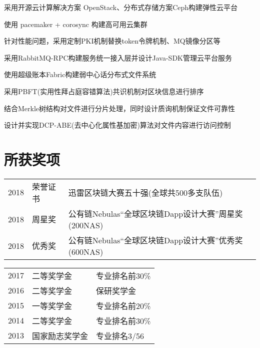 \documentclass[]{deedy-resume-openfont}
\begin{document}
\begin{minipage}[t]{0.68\textwidth}
\begin{tightemize}
    \item 采用开源云计算解决方案 OpenStack、分布式存储方案Ceph构建弹性云平台
    \item 使用 pacemaker + corosync 构建高可用云集群
    \item 针对性能问题，采用定制PKI机制替换token令牌机制、MQ镜像分区等
    \item 采用RabbitMQ-RPC构建服务统一接入层并设计Java-SDK管理云平台服务
    \end{tightemize}
\sectionsep

\begin{tightemize}
    \item 使用超级账本Fabric构建弱中心话分布式文件系统
    \item 采用PBFT(实用性拜占庭容错算法)共识机制对区块信息进行排序
    \item 结合Merkle树结构对文件进行分片处理，同时设计质询机制保证文件可靠性
    \item 设计并实现DCP-ABE(去中心化属性基加密)算法对文件内容进行访问控制
    \end{tightemize}
\sectionsep

\section{所获奖项}
\begin{tabular}{rll}
2018         & 荣誉证书  & 迅雷区块链大赛五十强(全球共500多支队伍) \\
2018         & 周星奖 & 公有链Nebulas“全球区块链Dapp设计大赛”周星奖(200NAS) \\
2018         & 优秀奖 & 公有链Nebulas“全球区块链Dapp设计大赛”优秀奖(600NAS) \\
\end{tabular}
\begin{tabular}{rll}
2017         & 二等奖学金 & 专业排名前{30\%} \\
2016         & 二等奖学金 & 保研奖学金 \\
2015         & 一等奖学金 & 专业排名前{20\%} \\
2014         & 二等奖学金 & 专业排名前{30\%} \\
2013         & 国家励志奖学金  & 专业排名{3/56} \\
\end{tabular}
\sectionsep


\sectionsep\end{minipage}
\end{document}

